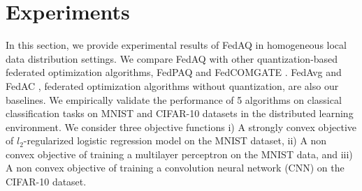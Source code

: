 \section{Experiments}
\label{experiment}

In this section, we provide experimental results of FedAQ in homogeneous local data distribution settings. We compare FedAQ with other quantization-based federated optimization algorithms, FedPAQ \citep{reisizadeh2020fedpaq} and FedCOMGATE \citep{haddadpour2021federated}. FedAvg \citep{mcmahan2017communication} and FedAC \citep{yuan2020federated}, federated optimization algorithms without quantization, are also our baselines. We empirically validate the performance of 5 algorithms on classical classification tasks on MNIST\citep{lecun1998mnist} and CIFAR-10\citep{krizhevsky2009learning} datasets in the distributed learning environment. We consider three objective functions i) A strongly convex objective of $l_2$-regularized logistic regression model on the MNIST dataset, ii) A non convex objective of training a multilayer perceptron on the MNIST data, and iii) A non convex objective of training a convolution neural network (CNN) on the CIFAR-10 dataset. %

    

